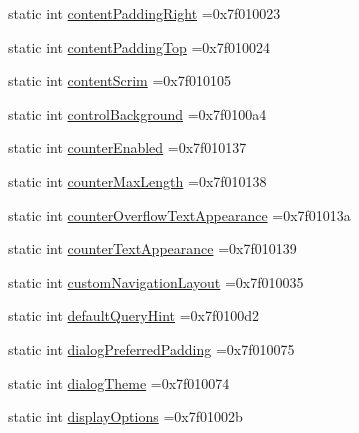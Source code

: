 \begin{DoxyCompactItemize}
\item 
static int \hyperlink{classandroid_1_1support_1_1graphics_1_1drawable_1_1animated_1_1R_1_1attr_a246f194a5f46a0c26ffae90d60faeca9}{content\+Padding\+Right} =0x7f010023
\item 
static int \hyperlink{classandroid_1_1support_1_1graphics_1_1drawable_1_1animated_1_1R_1_1attr_afcfea466a3b636a3a5e31bf35460c01a}{content\+Padding\+Top} =0x7f010024
\item 
static int \hyperlink{classandroid_1_1support_1_1graphics_1_1drawable_1_1animated_1_1R_1_1attr_a80ba71ce265dc918d7b421bb3894d965}{content\+Scrim} =0x7f010105
\item 
static int \hyperlink{classandroid_1_1support_1_1graphics_1_1drawable_1_1animated_1_1R_1_1attr_ad974a06fa2f591be6a90cea179c8f234}{control\+Background} =0x7f0100a4
\item 
static int \hyperlink{classandroid_1_1support_1_1graphics_1_1drawable_1_1animated_1_1R_1_1attr_a2e6bb6a01155188919823ebb2059e78f}{counter\+Enabled} =0x7f010137
\item 
static int \hyperlink{classandroid_1_1support_1_1graphics_1_1drawable_1_1animated_1_1R_1_1attr_a868ab6af84f6bd2609b356ab8558f4c0}{counter\+Max\+Length} =0x7f010138
\item 
static int \hyperlink{classandroid_1_1support_1_1graphics_1_1drawable_1_1animated_1_1R_1_1attr_ae471b079b0eda0ae89fa9ff9e0568ae1}{counter\+Overflow\+Text\+Appearance} =0x7f01013a
\item 
static int \hyperlink{classandroid_1_1support_1_1graphics_1_1drawable_1_1animated_1_1R_1_1attr_afb6a93c8d3fffc425bb4e02b404600d9}{counter\+Text\+Appearance} =0x7f010139
\item 
static int \hyperlink{classandroid_1_1support_1_1graphics_1_1drawable_1_1animated_1_1R_1_1attr_a5478917f16a2ba45a6e74c96bbd99d77}{custom\+Navigation\+Layout} =0x7f010035
\item 
static int \hyperlink{classandroid_1_1support_1_1graphics_1_1drawable_1_1animated_1_1R_1_1attr_aaaa0bc8e74988e3a30434fbae988edbe}{default\+Query\+Hint} =0x7f0100d2
\item 
static int \hyperlink{classandroid_1_1support_1_1graphics_1_1drawable_1_1animated_1_1R_1_1attr_a860729c36304ab5b3dde8d219e8cc5cc}{dialog\+Preferred\+Padding} =0x7f010075
\item 
static int \hyperlink{classandroid_1_1support_1_1graphics_1_1drawable_1_1animated_1_1R_1_1attr_a80c68c6c114ffc7153578f512e392f2f}{dialog\+Theme} =0x7f010074
\item 
static int \hyperlink{classandroid_1_1support_1_1graphics_1_1drawable_1_1animated_1_1R_1_1attr_a4ea1964459d1db0a1661629b37a85652}{display\+Options} =0x7f01002b

\end{DoxyCompactItemize}
